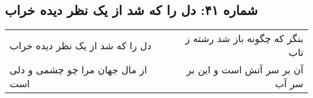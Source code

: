 \begin{center}
\section*{شماره ۴۱: دل را که شد از یک نظر دیده خراب}
\label{sec:041}
\begin{longtable}{l p{0.5cm} r}
دل را که شد از یک نظر دیده خراب
&&
بنگر که چگونه باز شد رشته ز تاب
\\
از مال جهان مرا چو چشمی و دلی است
&&
آن بر سر آتش است و این بر سر آب
\\
\end{longtable}
\end{center}
